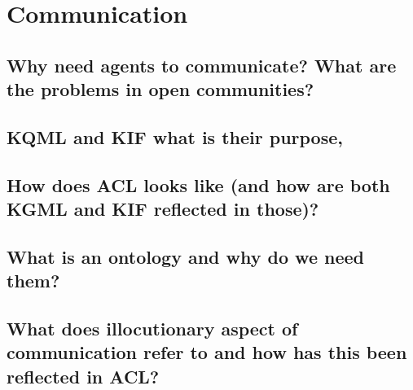 \section{Communication}
\subsection{Why need agents to communicate? What are the problems in open communities?}
\subsection{KQML and KIF what is their purpose,}
\subsection{How does ACL looks like (and how are both KGML and KIF reflected in those)?}
\subsection{What is an ontology and why do we need them?}
\subsection{What does illocutionary aspect of communication refer to and how has this been reflected in ACL?}

